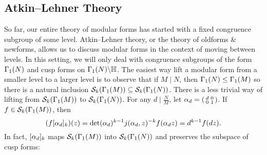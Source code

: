     \subsection*{Atkin–Lehner Theory}
      So far, our entire theory of modular forms has started with a fixed congruence subgroup of some level. Atkin–Lehner theory, or the theory of oldforms \& newforms, allows us to discuss modular forms in the context of moving between levels. In this setting, we will only deal with congruence subgroups of the form $\Gamma_{1}(N)$ and cusp forms on $\Gamma_{1}(N)\backslash\mathbb{H}$. The easiest way lift a modular form from a smaller level to a larger level is to observe that if $M \mid N$, then $\Gamma_{1}(N) \le \Gamma_{1}(M)$ so there is a natural inclusion $\mathcal{S}_{k}(\Gamma_{1}(M)) \subseteq \mathcal{S}_{k}(\Gamma_{1}(N))$. There is a less trivial way of lifting from $\mathcal{S}_{k}(\Gamma_{1}(M))$ to $\mathcal{S}_{k}(\Gamma_{1}(N))$. For any $d \mid \frac{N}{M}$, let $\alpha_{d} = \begin{psmallmatrix} d & 0 \\ 0 & 1 \end{psmallmatrix}$. If $f \in \mathcal{S}_{k}(\Gamma_{1}(M))$, then
      \[
          (f[\alpha_{d}]_{k})(z) = \det(\alpha_{d})^{k-1}j(\alpha_{d},z)^{-k}f(\alpha_{d} z) = d^{k-1}f(dz).
      \]
      In fact, $[\alpha_{d}]_{k}$ maps $\mathcal{S}_{k}(\Gamma_{1}(M))$ into $\mathcal{S}_{k}(\Gamma_{1}(N))$ and preserves the subspace of cusp forms:
      
